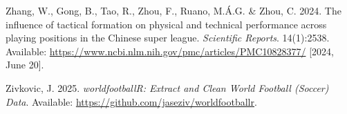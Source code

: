 \documentclass[
  a4paper,
  twoside]{uoe-thesis-template}
\newlength{\cslhangindent}
\newenvironment{CSLReferences}[2] %
 {\begin{list}{}{%
  \setlength{\itemindent}{0pt}
  \setlength{\leftmargin}{0pt}
  \setlength{\parsep}{0pt}
  \ifodd #1
   \setlength{\leftmargin}{\cslhangindent}
   \setlength{\itemindent}{-1\cslhangindent}
  \fi
  \setlength{\itemsep}{#2\baselineskip}}}
 {\end{list}}
\begin{document}
\begin{CSLReferences}{0}{0}
Zhang, W., Gong, B., Tao, R., Zhou, F., Ruano, M.Á.G. \& Zhou, C. 2024.
The influence of tactical formation on physical and technical
performance across playing positions in the {Chinese} super league.
\emph{Scientific Reports}. 14(1):2538. Available:
\url{https://www.ncbi.nlm.nih.gov/pmc/articles/PMC10828377/} {[}2024,
June 20{]}.

Zivkovic, J. 2025. \emph{{worldfootballR}: {Extract} and {Clean} {World}
{Football} ({Soccer}) {Data}}. Available:
\url{https://github.com/jaseziv/worldfootballr}.

\end{CSLReferences}
\end{document}
